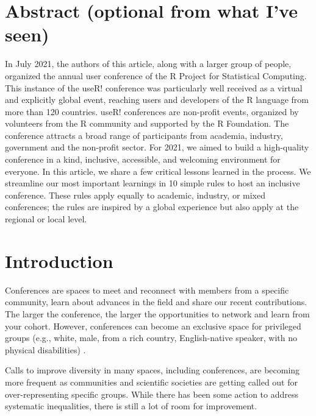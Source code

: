 \documentclass[10pt,letterpaper]{article}
\begin{document}
\section*{Abstract (optional from what I've seen)}

In July 2021, the authors of this article, along with a larger group of people, organized the annual user conference of the R Project for Statistical Computing. This instance of the useR! conference was particularly well received as a virtual and explicitly global event, reaching users and developers of the R language from more than 120 countries. useR! conferences are non-profit events, organized by volunteers from the R community and supported by the R Foundation. The conference attracts a broad range of participants from academia, industry, government and the non-profit sector. For 2021, we aimed to build a high-quality conference in a kind, inclusive, accessible, and welcoming environment for everyone. In this article, we share a few critical lessons learned in the process. We streamline our most important learnings in 10 simple rules to host an inclusive conference. These rules apply equally to academic, industry, or mixed conferences; the rules are inspired by a global experience but also apply at the regional or local level.



\linenumbers

\section*{Introduction}

Conferences are spaces to meet and reconnect with members from a specific community, learn about advances in the field and share our recent contributions. The larger the conference, the larger the opportunities to network and learn from your cohort. However, conferences can become an exclusive space for privileged groups (e.g., white, male, from a rich country, English-native speaker, with no physical disabilities)  \cite{arend_disparity_2019, timperley_he_2020, gewin_what_2019, brown_ableism_2018}.

Calls to improve diversity in many spaces, including conferences, are becoming more frequent as communities and scientific societies are getting called out for over-representing specific groups. While there has been some action to address systematic inequalities, there is still a lot of room for improvement.
\end{document}
